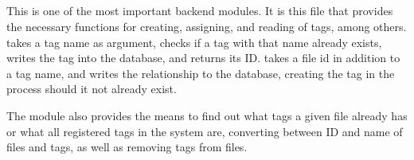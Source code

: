\subsection{}
\def\kapitelautor{Erik Ritschl}

This is one of the most important backend modules. It is this file that provides the necessary functions for creating, assigning, and reading of tags, among others.  takes a tag name as argument, checks if a tag with that name already exists, writes the tag into the database, and returns its ID.  takes a file id in addition to a tag name, and writes the relationship to the database, creating the tag in the process should it not already exist. 

The module also provides the means to find out what tags a given file already has or what all registered tags in the system are, converting between ID and name of files and tags, as well as removing tags from files.